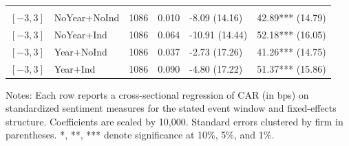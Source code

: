 \begin{table}[p]
\begin{tabular}{l l r r l l}
\addlinespace[2pt]
\multicolumn{6}{l}{\textit{Panel: $[-3,3]$}} \\
\addlinespace[1pt]
$[-3,3]$ & NoYear+NoInd & 1086 & 0.010 & -8.09 (14.16) & 42.89*** (14.79) \\
$[-3,3]$ & NoYear+Ind & 1086 & 0.064 & -10.91 (14.44) & 52.18*** (16.05) \\
$[-3,3]$ & Year+NoInd & 1086 & 0.037 & -2.73 (17.26) & 41.26*** (14.75) \\
$[-3,3]$ & Year+Ind & 1086 & 0.090 & -4.80 (17.22) & 51.37*** (15.86) \\
\bottomrule
\end{tabular}
\parbox{0.95\linewidth}{\footnotesize Notes: Each row reports a cross-sectional regression of CAR (in bps) on standardized sentiment measures for the stated event window and fixed-effects structure. Coefficients are scaled by 10,000. Standard errors clustered by firm in parentheses. *, **, *** denote significance at 10\%, 5\%, and 1\%.}
\end{table}
